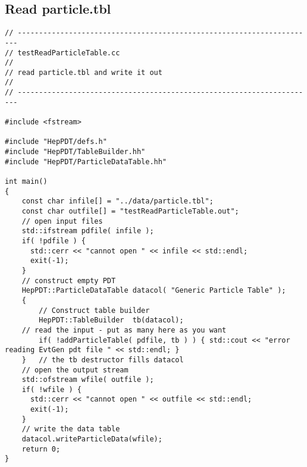 \subsection { Read particle.tbl }
\begin{verbatim}
// ----------------------------------------------------------------------
// testReadParticleTable.cc
//
// read particle.tbl and write it out
//
// ----------------------------------------------------------------------

#include <fstream>

#include "HepPDT/defs.h"
#include "HepPDT/TableBuilder.hh"
#include "HepPDT/ParticleDataTable.hh"

int main()
{
    const char infile[] = "../data/particle.tbl";
    const char outfile[] = "testReadParticleTable.out";
    // open input files
    std::ifstream pdfile( infile );
    if( !pdfile ) { 
      std::cerr << "cannot open " << infile << std::endl;
      exit(-1);
    }
    // construct empty PDT
    HepPDT::ParticleDataTable datacol( "Generic Particle Table" );
    {
        // Construct table builder
        HepPDT::TableBuilder  tb(datacol);
	// read the input - put as many here as you want
        if( !addParticleTable( pdfile, tb ) ) { std::cout << "error reading EvtGen pdt file " << std::endl; }
    }	// the tb destructor fills datacol
    // open the output stream
    std::ofstream wfile( outfile );
    if( !wfile ) { 
      std::cerr << "cannot open " << outfile << std::endl;
      exit(-1);
    }
    // write the data table
    datacol.writeParticleData(wfile);
    return 0;
}
\end{verbatim}

